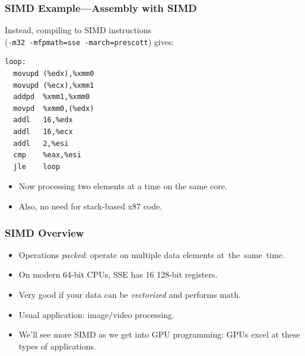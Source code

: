 \documentclass[aspectratio=43]{beamer}
\newenvironment{changemargin}[1]{%
  \begin{list}{}{%
    \setlength{\topsep}{0pt}%
    \setlength{\leftmargin}{#1}%
    \setlength{\rightmargin}{1em}
    \setlength{\listparindent}{\parindent}%
    \setlength{\itemindent}{\parindent}%
    \setlength{\parsep}{\parskip}%
  }%
  \item[]}{\end{list}}
\begin{document}
\begin{frame}[fragile]
  \frametitle{SIMD Example---Assembly with SIMD}

  \begin{changemargin}{1.5cm}
 Instead, compiling to SIMD instructions\\ ({\tt -m32 -mfpmath=sse -march=prescott}) gives:

  \begin{lstlisting}
loop:
  movupd (%edx),%xmm0
  movupd (%ecx),%xmm1
  addpd  %xmm1,%xmm0
  movpd  %xmm0,(%edx)
  addl   16,%edx
  addl   16,%ecx
  addl   2,%esi
  cmp    %eax,%esi
  jle    loop
  \end{lstlisting}

  \begin{itemize}
    \item Now processing two elements at a time on the same core.
    \item Also, no need for stack-based x87 code.
  \end{itemize}
  \end{changemargin}
\end{frame}

\begin{frame}
  \frametitle{SIMD Overview}

  \begin{changemargin}{1cm}
  \begin{itemize}
    \item Operations \emph{packed}: operate on multiple data elements 
      at~the~same~time.
    \vfill
    \item On modern 64-bit CPUs, SSE has 16 128-bit registers.
    \vfill
    \item Very good if your data can be \emph{vectorized} and performs math.
    \vfill
    \item Usual application: image/video processing.
    \vfill
    \item We'll see more SIMD as we get into GPU programming: GPUs excel
       at these types of applications.
  \end{itemize}
  \end{changemargin}

\end{frame}
\end{document}
